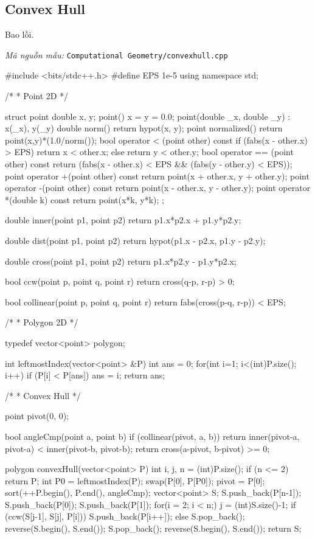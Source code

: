 \documentclass[11pt]{article}
\newcommand{\codepath}[1]{\par\noindent\textit{Mã nguồn mẫu:} \texttt{#1}\par}
\begin{document}
\subsection{Convex Hull}

Bao lồi.

\codepath{Computational Geometry/convexhull.cpp}

\begingroup\scriptsize
\begin{vncode}
#include <bits/stdc++.h>
#define EPS 1e-5
using namespace std;

/*
 * Point 2D
 */

struct point {
	double x, y;
	point() { x = y = 0.0; }
	point(double _x, double _y) : x(_x), y(_y) {}
	double norm() {
		return hypot(x, y);
	}
	point normalized() {
		return point(x,y)*(1.0/norm());
	}
	bool operator < (point other) const {
		if (fabs(x - other.x) > EPS) return x < other.x;
		else return y < other.y;
	}
	bool operator == (point other) const {
		return (fabs(x - other.x) < EPS && (fabs(y - other.y) < EPS));
	}
	point operator +(point other) const{
		return point(x + other.x, y + other.y);
	}
	point operator -(point other) const{
		return point(x - other.x, y - other.y);
	}
	point operator *(double k) const{
		return point(x*k, y*k);
	}
};

double inner(point p1, point p2) {
	return p1.x*p2.x + p1.y*p2.y;
}

double dist(point p1, point p2) {
	return hypot(p1.x - p2.x, p1.y - p2.y);
}

double cross(point p1, point p2) {
	return p1.x*p2.y - p1.y*p2.x;
}

bool ccw(point p, point q, point r) {
	return cross(q-p, r-p) > 0;
}

bool collinear(point p, point q, point r) {
	return fabs(cross(p-q, r-p)) < EPS;
}

/*
 * Polygon 2D
 */

typedef vector<point> polygon;

int leftmostIndex(vector<point> &P) {
	int ans = 0;
	for(int i=1; i<(int)P.size(); i++) {
		if (P[i] < P[ans]) ans = i;
	}
	return ans;
}


/*
 * Convex Hull
 */

point pivot(0, 0);

bool angleCmp(point a, point b) {
	if (collinear(pivot, a, b))
		return inner(pivot-a, pivot-a) < inner(pivot-b, pivot-b);
	return cross(a-pivot, b-pivot) >= 0;
}

polygon convexHull(vector<point> P) {
	int i, j, n = (int)P.size();
	if (n <= 2) return P;
	int P0 = leftmostIndex(P);
	swap(P[0], P[P0]);
	pivot = P[0];
	sort(++P.begin(), P.end(), angleCmp);
	vector<point> S;
	S.push_back(P[n-1]);
	S.push_back(P[0]);
	S.push_back(P[1]);
	for(i = 2; i < n;) {
		j = (int)S.size()-1;
		if (ccw(S[j-1], S[j], P[i])) S.push_back(P[i++]);
		else S.pop_back();
	}
	reverse(S.begin(), S.end());
	S.pop_back();
	reverse(S.begin(), S.end());
	return S;
}


\end{vncode}
\end{document}
